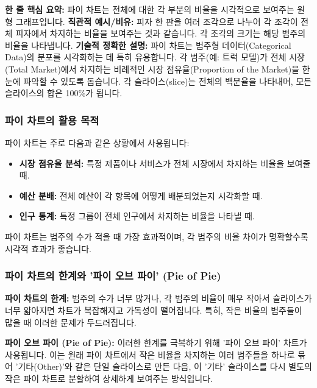 \documentclass[11pt,a4paper]{book}
\theoremstyle{definition}
\begin{document}
\begin{conceptbox}
\textbf{한 줄 핵심 요약:} 파이 차트는 전체에 대한 각 부분의 비율을 시각적으로 보여주는 원형 그래프입니다.
\textbf{직관적 예시/비유:} 피자 한 판을 여러 조각으로 나누어 각 조각이 전체 피자에서 차지하는 비율을 보여주는 것과 같습니다. 각 조각의 크기는 해당 범주의 비율을 나타냅니다.
\textbf{기술적 정확한 설명:} 파이 차트는 범주형 데이터(Categorical Data)의 분포를 시각화하는 데 특히 유용합니다. 각 범주(예: 트럭 모델)가 전체 시장(Total Market)에서 차지하는 비례적인 시장 점유율(Proportion of the Market)을 한눈에 파악할 수 있도록 돕습니다. 각 슬라이스(slice)는 전체의 백분율을 나타내며, 모든 슬라이스의 합은 100\%가 됩니다.
\end{conceptbox}

\subsubsection{파이 차트의 활용 목적}
파이 차트는 주로 다음과 같은 상황에서 사용됩니다:
\begin{itemize}
    \item \textbf{시장 점유율 분석:} 특정 제품이나 서비스가 전체 시장에서 차지하는 비율을 보여줄 때.
    \item \textbf{예산 분배:} 전체 예산이 각 항목에 어떻게 배분되었는지 시각화할 때.
    \item \textbf{인구 통계:} 특정 그룹이 전체 인구에서 차지하는 비율을 나타낼 때.
\end{itemize}
파이 차트는 범주의 수가 적을 때 가장 효과적이며, 각 범주의 비율 차이가 명확할수록 시각적 효과가 좋습니다.

\subsubsection{파이 차트의 한계와 '파이 오브 파이' (Pie of Pie)}
\begin{warningbox}
\textbf{파이 차트의 한계:} 범주의 수가 너무 많거나, 각 범주의 비율이 매우 작아서 슬라이스가 너무 얇아지면 차트가 복잡해지고 가독성이 떨어집니다. 특히, 작은 비율의 범주들이 많을 때 이러한 문제가 두드러집니다.
\end{warningbox}

\begin{conceptbox}
\textbf{파이 오브 파이 (Pie of Pie):} 이러한 한계를 극복하기 위해 '파이 오브 파이' 차트가 사용됩니다. 이는 원래 파이 차트에서 작은 비율을 차지하는 여러 범주들을 하나로 묶어 '기타(Other)'와 같은 단일 슬라이스로 만든 다음, 이 '기타' 슬라이스를 다시 별도의 작은 파이 차트로 분할하여 상세하게 보여주는 방식입니다.
\end{conceptbox}
\end{document}
